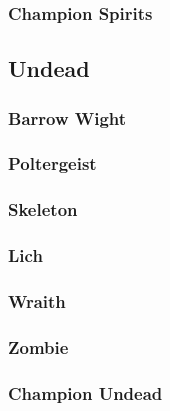 \subsubsection{Champion Spirits}

\subsection{Undead}
\begin{multicols}{2}
    \subsubsection*{Barrow Wight}\label{foe:barrow-wight}
    \subsubsection*{Poltergeist}\label{foe:poltergeist}
    \subsubsection*{Skeleton}\label{foe:skeleton}
    \subsubsection*{Lich}\label{foe:undead-mage}
    \subsubsection*{Wraith}\label{foe:wraith}
    \subsubsection*{Zombie}\label{foe:zombie}
\end{multicols}
\subsubsection{Champion Undead}